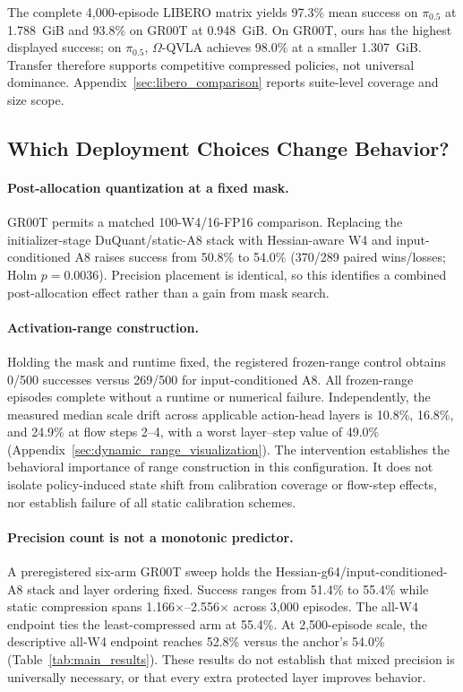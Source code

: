 

The complete 4,000-episode LIBERO matrix yields 97.3\% mean success on $\pi_{0.5}$ at 1.788~GiB and 93.8\% on GR00T at 0.948~GiB. On GR00T, ours has the highest displayed success; on $\pi_{0.5}$, $\Omega$-QVLA achieves 98.0\% at a smaller 1.307~GiB. Transfer therefore supports competitive compressed policies, not universal dominance. Appendix~\ref{sec:libero_comparison} reports suite-level coverage and size scope.

\subsection{Which Deployment Choices Change Behavior?}
\label{sec:core_ablation_main}

\paragraph{Post-allocation quantization at a fixed mask.}
GR00T permits a matched 100-W4/16-FP16 comparison. Replacing the initializer-stage DuQuant/static-A8 stack with Hessian-aware W4 and input-conditioned A8 raises success from 50.8\% to 54.0\% (370/289 paired wins/losses; Holm $p=0.0036$). Precision placement is identical, so this identifies a combined post-allocation effect rather than a gain from mask search.

\paragraph{Activation-range construction.}
Holding the mask and runtime fixed, the registered frozen-range control obtains 0/500 successes versus 269/500 for input-conditioned A8. All frozen-range episodes complete without a runtime or numerical failure. Independently, the measured median scale drift across applicable action-head layers is 10.8\%, 16.8\%, and 24.9\% at flow steps 2--4, with a worst layer--step value of 49.0\% (Appendix~\ref{sec:dynamic_range_visualization}). The intervention establishes the behavioral importance of range construction in this configuration. It does not isolate policy-induced state shift from calibration coverage or flow-step effects, nor establish failure of all static calibration schemes.

\paragraph{Precision count is not a monotonic predictor.}
A preregistered six-arm GR00T sweep holds the Hessian-g64/input-conditioned-A8 stack and layer ordering fixed. Success ranges from 51.4\% to 55.4\% while static compression spans 1.166$\times$--2.556$\times$ across 3,000 episodes. The all-W4 endpoint ties the least-compressed arm at 55.4\%. At 2,500-episode scale, the descriptive all-W4 endpoint reaches 52.8\% versus the anchor's 54.0\% (Table~\ref{tab:main_results}). These results do not establish that mixed precision is universally necessary, or that every extra protected layer improves behavior.

